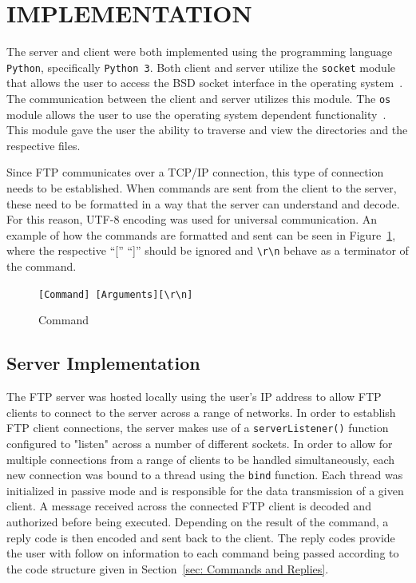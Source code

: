 \documentclass[10pt,twocolumn]{witseiepaper}
\def\code#1{\texttt{#1}}
\begin{document}
%
\section{IMPLEMENTATION}
\label{sec: Implementation}
The server and client were both implemented using the programming language \code{Python}, specifically \code{Python 3}. Both client and server utilize the \code{socket} module that allows the user to access the BSD socket interface in the operating system~\cite{socket}. The communication between the client and server utilizes this module. The \code{os} module allows the user to use the operating system dependent functionality~\cite{os}. This module gave the user the ability to traverse and view the directories and the respective files.

Since FTP communicates over a TCP/IP connection, this type of connection needs to be established. When commands are sent from the client to the server, these need to be formatted in a way that the server can understand and decode. For this reason, UTF-8 encoding was used for universal communication. An example of how the commands are formatted and sent can be seen in Figure~\ref{fig: Communication}, where the respective ``['' ``]'' should be ignored and \code{\textbackslash r\textbackslash n} behave as a terminator of the command.

\begin{figure}[h!]
\renewcommand{\thefigure}{\arabic{figure}}
\centering
\code{[Command]\ [Arguments][\textbackslash r\textbackslash n]}
\caption{Command}
\label{fig: Communication}
\end{figure}


\subsection{Server Implementation}
\label{sec: Server Implementation}
The FTP server was hosted locally using the user's IP address to allow FTP clients to connect to the server across a range of networks. In order to establish FTP client connections, the server makes use of a \texttt{serverListener()} function configured to "listen" across a number of different sockets. In order to allow for multiple connections from a range of clients to be handled simultaneously, each new connection was bound to a thread using the \texttt{bind} function. Each thread was initialized in passive mode and is responsible for the data transmission of a given client. A message received across the connected FTP client is decoded and authorized before being executed. Depending on the result of the command, a reply code is then encoded and sent back to the client. The reply codes provide the user with follow on information to each command being passed according to the code structure given in Section~\ref{sec: Commands and Replies}.
\end{document}
